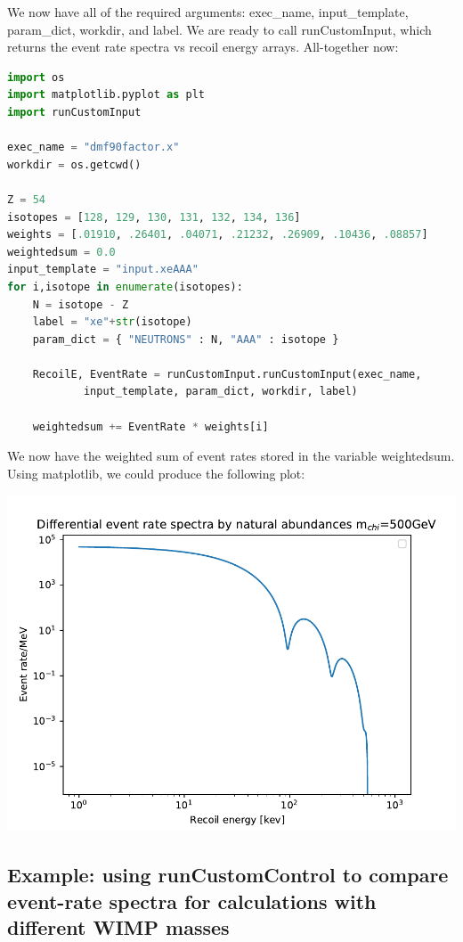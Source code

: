 \documentclass[12pt]{article}
\begin{document}
We now have all of the required arguments: exec\_name, input\_template,
param\_dict, workdir, and label. We are ready to call runCustomInput, which
returns the event rate spectra vs recoil energy arrays. All-together now:
\begin{lstlisting}[language=python]
import os
import matplotlib.pyplot as plt
import runCustomInput

exec_name = "dmf90factor.x"
workdir = os.getcwd()

Z = 54
isotopes = [128, 129, 130, 131, 132, 134, 136]
weights = [.01910, .26401, .04071, .21232, .26909, .10436, .08857]
weightedsum = 0.0
input_template = "input.xeAAA"
for i,isotope in enumerate(isotopes):
    N = isotope - Z
    label = "xe"+str(isotope)
    param_dict = { "NEUTRONS" : N, "AAA" : isotope }

    RecoilE, EventRate = runCustomInput.runCustomInput(exec_name,
            input_template, param_dict, workdir, label)

    weightedsum += EventRate * weights[i]    
\end{lstlisting}
We now have the weighted sum of event rates stored in the variable weightedsum.
Using matplotlib, we could produce the following plot:

{
	\centering
\includegraphics[width=\textwidth]{weightedspectra.pdf}

}

\subsection{Example: using runCustomControl to compare event-rate spectra for
calculations with different WIMP masses}
\end{document}
